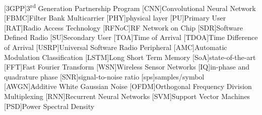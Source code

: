 \begin{acronym}[HBCI]
%
%
%
%
%

[3GPP]{3\textsuperscript{rd} Generation Partnership Program}
[CNN]{Convolutional Neural Network}
[FBMC]{Filter Bank Multicarrier}
[PHY]{physical layer}
[PU]{Primary User}
[RAT]{Radio Access Technology}
[RFNoC]{RF Network on Chip}
[SDR]{Software Defined Radio}
[SU]{Secondary User}
[TOA]{Time of Arrival}
[TDOA]{Time Difference of Arrival}
[USRP]{Universal Software Radio Peripheral}
[AMC]{Automatic Modulation Classification}
[LSTM]{Long Short Term Memory}
[SoA]{state-of-the-art}
[FFT]{Fast Fourier Transform}
[WSN]{Wireless Sensor Networks}
[IQ]{in-phase and quadrature phase}
[SNR]{signal-to-noise ratio}
[sps]{samples/symbol}
[AWGN]{Additive White Gaussian Noise}
[OFDM]{Orthogonal Frequency Division Multiplexing}
[RNN]{Recurrent Neural Networks}
[SVM]{Support Vector Machines}
[PSD]{Power Spectral Density}
\end{acronym}